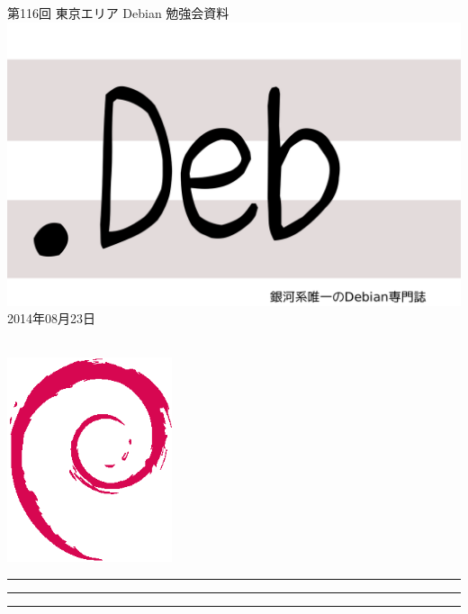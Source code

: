 \documentclass[mingoth,a4paper]{jsarticle}
\newcommand{\debmtgyear}{2014}
\newcommand{\debmtgmonth}{08}
\newcommand{\debmtgdate}{23}
\newcommand{\debmtgnumber}{116}
\begin{document}
\begin{titlepage}
\thispagestyle{empty}

\vspace*{-2cm}
第\debmtgnumber{}回 東京エリア Debian 勉強会資料\\
\hspace*{-2cm}
\includegraphics{image2012-natsu/dotdeb.pdf}\\
\hfill{}\debmtgyear{}年\debmtgmonth{}月\debmtgdate{}日

\\

\vspace*{-2cm}
\hfill{}\includegraphics[height=6cm]{image200502/openlogo-nd.eps}
\end{titlepage}

\newpage

\begin{minipage}[b]{0.2\hsize}
 \colorbox{titleback}{}
\end{minipage}
\begin{minipage}[b]{0.8\hsize}
\hrule
\vspace{2mm}
\hrule
\begin{multicols}{2}
\tableofcontents
\end{multicols}
\vspace{2mm}
\hrule
\end{minipage}
\end{document}
